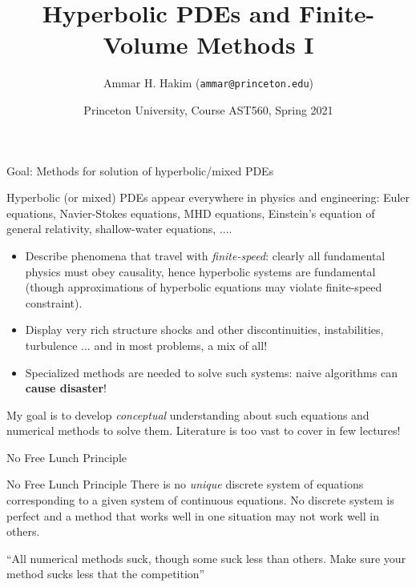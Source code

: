 \documentclass[aspectratio=169]{beamer}
\title[{\tt }]{Hyperbolic PDEs and Finite-Volume Methods I}%
\author[https://ast560.rtfd.io]%
{Ammar H. Hakim ({\tt ammar@princeton.edu}) \inst{1}}%
\institute[PPPL]
{ \inst{1} Princeton Plasma Physics Laboratory, Princeton, NJ %
}
\date[2/9/2021]{Princeton University, Course AST560, Spring 2021}
\newcommand{\mypause}{}
\begin{document}
\begin{frame}[plain]
  \titlepage
\end{frame}

\begin{frame}{Goal: Methods for solution of hyperbolic/mixed PDEs}

  Hyperbolic (or mixed) PDEs appear everywhere in physics and
  engineering: Euler equations, Navier-Stokes equations, MHD
  equations, Einstein's equation of general relativity, shallow-water
  equations, ....%
  \mypause%
  \begin{itemize}
  \item Describe phenomena that travel with \emph{finite-speed}:
    clearly all fundamental physics must obey causality, hence
    hyperbolic systems are fundamental (though approximations of
    hyperbolic equations may violate finite-speed constraint).
    \mypause%
  \item Display very rich structure shocks and other discontinuities,
    instabilities, turbulence ... and in most problems, a mix of all!
    \mypause%
  \item Specialized methods are needed to solve such systems: naive
    algorithms can {\bf cause disaster}!
  \end{itemize}
  \mypause%
  My goal is to develop \emph{conceptual} understanding about such
  equations and numerical methods to solve them. Literature is too
  vast to cover in few lectures!

\end{frame}


\begin{frame}{No Free Lunch Principle}

  \begin{block}{No Free Lunch Principle}
    There is no \emph{unique} discrete system of equations
    corresponding to a given system of continuous equations. No
    discrete system is perfect and a method that works well in one
    situation may not work well in others.
  \end{block}
  \vskip0.1in%
  \mypause%
  ``All numerical methods suck, though some suck less than
  others. Make sure your method sucks less that the competition''
  
\end{frame}

\end{document}
